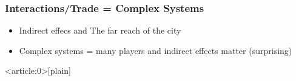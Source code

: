 \begin{frame}
  \frametitle{Interactions/Trade = Complex Systems}

  \begin{itemize}
\item Indirect effecs and The far reach of the city
\item Complex systems = many players and indirect effects matter (surprising)

  \end{itemize}




\end{frame}



{ %
    \begin{frame}<article:0>[plain]
     \end{frame}
}



